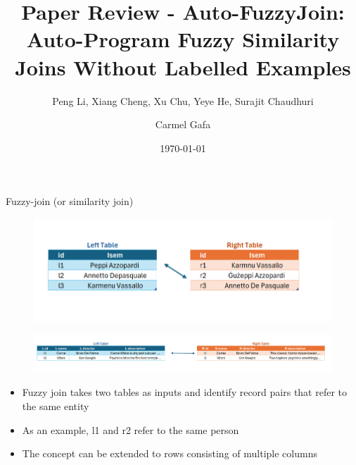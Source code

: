 \documentclass[8pt]{beamer} %
\title{Paper Review - Auto-FuzzyJoin: Auto-Program Fuzzy Similarity Joins Without Labelled Examples}
\subtitle{Peng Li, Xiang Cheng, Xu Chu, Yeye He, Surajit Chaudhuri}
\date{\today}
\author{Carmel Gafa}
\begin{document}

\begin{frame}[plain]
    \maketitle
\end{frame}


\begin{frame}{Fuzzy-join (or similarity join)}
	\begin{figure}
		\centering
		\includegraphics[width=0.7\linewidth]{FuzzyJoin}
	\end{figure}

	\begin{figure}
		\centering
		\includegraphics[width=1\linewidth]{img/FuzzyJoin_2}
	\end{figure}

	\begin{itemize}
		\item Fuzzy join takes two tables as inputs and identify record pairs that refer to the same entity
		\item As an example, l1 and r2 refer to the same person
		\item The concept can be extended to rows consisting of multiple columns
	\end{itemize}
\end{frame}
\end{document}
